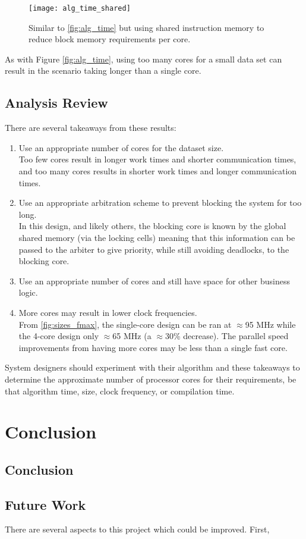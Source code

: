 \begin{figure}[h]
\centering
\texttt{[image: alg\_time\_shared]}
\caption{Similar to \cref{fig:alg_time} but using shared instruction memory to reduce block memory requirements per core.}
\label{fig:alg_time_shared}
\end{figure}

As with Figure \ref{fig:alg_time}, using too many cores for a small data set can result in the scenario taking longer than a single core.

\section{Analysis Review}
There are several takeaways from these results:
\begin{enumerate}
\item Use an appropriate number of cores for the dataset size.\\Too few cores result in longer work times and shorter communication times, and too many cores results in shorter work times and longer communication times.

\item Use an appropriate arbitration scheme to prevent blocking the system for too long.\\
In this design, and likely others, the blocking core is known by the global shared memory (via the locking cells) meaning that this information can be passed to the arbiter to give priority, while still avoiding deadlocks, to the blocking core.

\item Use an appropriate number of cores and still have space for other business logic.

\item More cores may result in lower clock frequencies.\\From \cref{fig:sizes_fmax}, the single-core design can be ran at $\approx$95 MHz while the 4-core design only $\approx$65 MHz (a $\approx$30\% decrease). The parallel speed improvements from having more cores may be less than a single fast core.
\end{enumerate}

System designers should experiment with their algorithm and these takeaways to determine the approximate number of processor cores for their requirements, be that algorithm time, size, clock frequency, or compilation time.



\chapter{Conclusion}

\section{Conclusion}




\section{Future Work}
There are several aspects to this project which could be improved. First, 













